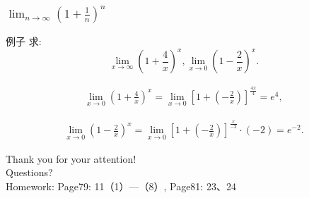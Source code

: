 \documentclass[
10pt,  
aspectratio=43,  
]{beamer}
\begin{document}
\begin{frame}
	\frametitle{$\lim_{n\to\infty}\left(1+\frac1n\right)^n$}
	\begin{exampleblock}{例子}
		求: $$
		\lim _{x \rightarrow \infty}\left(1+\frac{4}{x}\right)^x,   \lim _{x \rightarrow 0}\left(1-\frac{2}{x}\right)^x.
		$$
	\end{exampleblock}
	
	\begin{equation*}
		\begin{aligned}
			\lim _{x \rightarrow 0}\left(1+\frac{4}{x}\right)^x=\lim _{x \rightarrow 0}\left[1+\left(-\frac{2}{x}\right)\right]^{\frac{4x}{4}}=e^{4}, 
		\end{aligned}
	\end{equation*}
	
	
	\begin{equation*}
		\begin{aligned}
			\lim _{x \rightarrow 0}\left(1-\frac{2}{x}\right)^x=\lim _{x \rightarrow 0}\left[1+\left(-\frac{2}{x}\right)\right]^{\frac{x}{-2}} \cdot(-2)=e^{-2}. 
		\end{aligned}
	\end{equation*}
\end{frame}



\begin{frame}[plain]
	\vfill
	\centering
	{
		\centering \Huge \color{white} Thank you for your attention!\\[10pt]Questions?\\Homework: Page79:  11（1）—（8）,   Page81:  23、24
	}
	\vfill
\end{frame}
\end{document}

